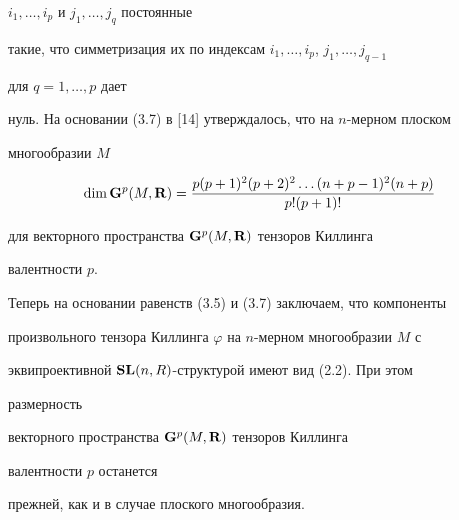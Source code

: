 $i_1,\dotsc,i_p$ и $j_1,\dotsc,j_q$ постоянные 


такие, что симметризация их по индексам $i_1,\dotsc,i_p$, $j_1,\dotsc,j_{q-1}$ 


для $q=1,\dotsc,p$ дает 


нуль. На основании (3.7) в [14] утверждалось, что на $n$-мерном плоском 


многообразии $M$ 


$$ 


\dim\bold G^p(M,\bold R)= 


\frac{p(p+1)^2(p+2)^2\dotsc(n+p-1)^2(n+p)}{p!(p+1)!} 


$$ 


для векторного пространства $\bold G^p(M,\bold R)$ тензоров Киллинга 


валентности $p$. 


 


Теперь на основании равенств (3.5) и (3.7) заключаем, что компоненты 


произвольного тензора Киллинга $\varphi$ на $n$-мерном многообразии $M$ с 


эквипроективной $\bold {SL}(n,R)$-структурой имеют вид (2.2). При этом 


размерность 


векторного пространства $\bold G^p(M,\bold R)$ тензоров Киллинга 


валентности $p$ останется 


прежней, как и в случае плоского многообразия. 


 


 


